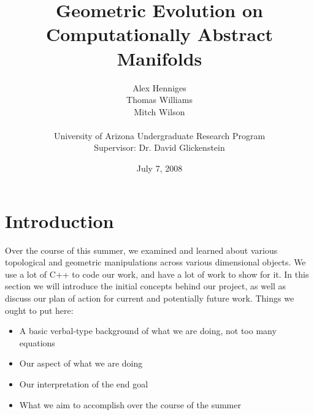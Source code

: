 \documentclass[12pt]{article}
\title{Geometric Evolution on Computationally Abstract Manifolds}
\author{Alex Henniges \\ Thomas Williams \\ Mitch Wilson \\ \\ University of Arizona Undergraduate Research Program\\
Supervisor: Dr. David Glickenstein\\
}
\date{July 7, 2008}
\begin{document}
	\maketitle
  \newpage
  \section{Introduction}
  \maketitle
  Over the course of this summer, we examined and learned about various topological and geometric manipulations across various dimensional objects. We use a lot of C++ to code our work, and have a lot of work to show for it. In this section we will introduce the initial concepts behind our project, as well as discuss our plan of action for current and potentially future work. 
  Things we ought to put here:
  \begin{itemize}
  \item A basic verbal-type background of what we are doing, not too many equations
  \item Our aspect of what we are doing
  \item Our interpretation of the end goal
  \item What we aim to accomplish over the course of the summer
  \end{itemize}
  
\end{document}
